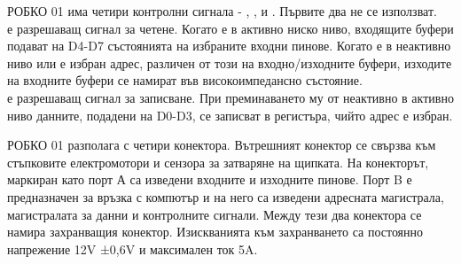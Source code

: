 \indent{}
\FloatBarrier
РОБКО 01 има четири контролни сигнала - , ,  и . Първите два не се използват.\\
\indent{}
 е разрешаващ сигнал за четене. Когато е в активно ниско ниво, входящите буфери подават на D4-D7 състоянията на избраните входни пинове. Когато е в неактивно ниво или е избран адрес, различен от този на входно/изходните буфери, изходите на входните буфери се намират във високоимпедансно състояние.\\
\indent{}
 е разрешаващ сигнал за записване. При преминаването му от неактивно в активно ниво данните, подадени на D0-D3, се записват в регистъра, чийто адрес е избран.

РОБКО 01 разполага с четири конектора. Вътрешният конектор се свързва към стъпковите електромотори и сензора за затваряне на щипката. На конекторът, маркиран като порт А са изведени входните и изходните пинове. Порт B е предназначен за връзка с компютър и на него са изведени адресната магистрала, магистралата за данни и контролните сигнали. Между тези два конектора се намира захранващия конектор. Изискванията към захранването са постоянно напрежение 12V ±0,6V и максимален ток 5A.
\cite{robko-man}
